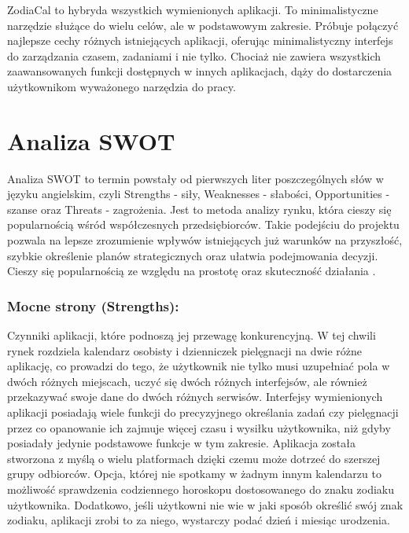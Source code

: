 ZodiaCal to hybryda wszystkich wymienionych aplikacji.
To minimalistyczne narzędzie służące do wielu celów, ale w podstawowym zakresie.
Próbuje połączyć najlepsze cechy różnych istniejących aplikacji,
oferując minimalistyczny interfejs do zarządzania czasem, zadaniami i nie tylko.
Chociaż nie zawiera wszystkich zaawansowanych funkcji dostępnych w innych aplikacjach,
dąży do dostarczenia użytkownikom wyważonego narzędzia do pracy.


\section{Analiza SWOT}
\phantom{Th}
Analiza SWOT to termin powstały od pierwszych liter poszczególnych słów w języku angielskim,
czyli Strengths - siły, Weaknesses - słabości, Opportunities - szanse oraz Threats - zagrożenia.
Jest to metoda analizy rynku, która cieszy się popularnością wśród współczesnych przedsiębiorców.
Takie podejściu do projektu pozwala na lepsze zrozumienie wpływów istniejących już warunków na przyszłość,
szybkie określenie planów strategicznych oraz ułatwia podejmowania decyzji.
Cieszy się popularnością ze względu na prostotę oraz skuteczność działania \cite{businessanalysis}.



\subsubsection*{\textbf{Mocne strony (Strengths):}}
\phantom{Th}
Czynniki aplikacji, które podnoszą jej przewagę konkurencyjną. W tej chwili rynek rozdziela kalendarz osobisty i dzienniczek pielęgnacji na dwie różne aplikację,
co prowadzi do tego, że użytkownik nie tylko musi uzupełniać pola w dwóch różnych miejscach,
uczyć się dwóch różnych interfejsów, ale również przekazywać swoje dane do dwóch różnych serwisów.
Interfejsy wymienionych aplikacji posiadają wiele funkcji do precyzyjnego określania zadań
czy pielęgnacji przez co opanowanie ich zajmuje więcej czasu i wysiłku użytkownika,
niż gdyby posiadały jedynie podstawowe funkcje w tym zakresie.
Aplikacja została stworzona z myślą o wielu platformach dzięki czemu może dotrzeć do szerszej grupy odbiorców.
Opcja, której nie spotkamy w żadnym innym kalendarzu to możliwość sprawdzenia codziennego horoskopu dostosowanego do znaku zodiaku użytkownika.
Dodatkowo, jeśli użytkowni nie wie w jaki sposób określić swój znak zodiaku, aplikacji zrobi to za niego, wystarczy podać dzień i miesiąc urodzenia.


